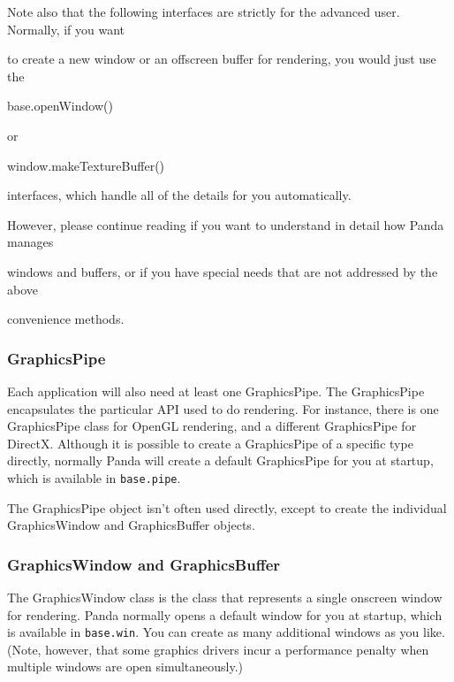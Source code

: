 \documentclass[a4paper]{article}
\newcommand\textstyleSourceText[1]{\texttt{#1}}
\newcommand\textstyleOOoComputerIdent[1]{\textrm{\textcolor[rgb]{0.0,0.5019608,0.0}{#1}}}
\newcommand\textstyleOOoComputerBase[1]{\textrm{\textcolor{black}{#1}}}
\begin{document}
{\color{black}
Note also that the following interfaces are strictly for the advanced user. Normally, if you want }

{\color{black}
to create a new window or an offscreen buffer for rendering, you would just use the }


\bigskip

{\ttfamily\color{black}
\textstyleOOoComputerIdent{base}\textstyleOOoComputerBase{.}\textstyleOOoComputerIdent{openWindow}\textstyleOOoComputerBase{()}}

{\color{black}
or }

{\ttfamily\color{black}
\textstyleOOoComputerIdent{window}\textstyleOOoComputerBase{.}\textstyleOOoComputerIdent{makeTextureBuffer}\textstyleOOoComputerBase{()}}


\bigskip

{\color{black}
interfaces, which handle all of the details for you automatically. }

{\color{black}
However, please continue reading if you want to understand in detail how Panda manages }

{\color{black}
windows and buffers, or if you have special needs that are not addressed by the above }

{\color{black}
convenience methods. }


\bigskip

\subsubsection[GraphicsPipe]{GraphicsPipe}
\hypertarget{RefHeading4096869075401}{}{\color{black}
Each application will also need at least one GraphicsPipe. The GraphicsPipe encapsulates the particular API used to do
rendering. For instance, there is one GraphicsPipe class for OpenGL rendering, and a different GraphicsPipe for
DirectX. Although it is possible to create a GraphicsPipe of a specific type directly, normally Panda will create a
default GraphicsPipe for you at startup, which is available in \textstyleSourceText{base.pipe}. }

{\color{black}
The GraphicsPipe object isn't often used directly, except to create the individual GraphicsWindow and GraphicsBuffer
objects. }

\subsubsection[GraphicsWindow and GraphicsBuffer]{GraphicsWindow and GraphicsBuffer}
\hypertarget{RefHeading4098869075401}{}{\color{black}
The GraphicsWindow class is the class that represents a single onscreen window for rendering. Panda normally opens a
default window for you at startup, which is available in \textstyleSourceText{base.win}. You can create as many
additional windows as you like. (Note, however, that some graphics drivers incur a performance penalty when multiple
windows are open simultaneously.) }
\end{document}
